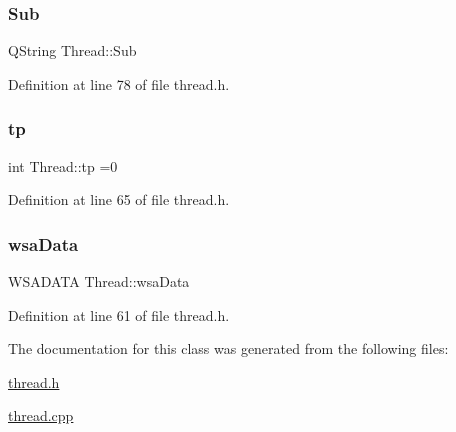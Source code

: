 \mbox{\label{class_thread_acbf38b0bc389598b66d3af13894c048f}} 
\subsubsection{\texorpdfstring{Sub}{Sub}}
{\footnotesize\ttfamily Q\+String Thread\+::\+Sub\hspace{0.3cm}{\ttfamily [private]}}



Definition at line 78 of file thread.\+h.

\mbox{\label{class_thread_a80dcf80149790844e887bdd9d3e47581}} 
\subsubsection{\texorpdfstring{tp}{tp}}
{\footnotesize\ttfamily int Thread\+::tp =0\hspace{0.3cm}{\ttfamily [private]}}



Definition at line 65 of file thread.\+h.

\mbox{\label{class_thread_af4e6c4fe4f46ba6b7c9218d3c02b9a20}} 
\subsubsection{\texorpdfstring{wsa\+Data}{wsaData}}
{\footnotesize\ttfamily W\+S\+A\+D\+A\+TA Thread\+::wsa\+Data\hspace{0.3cm}{\ttfamily [private]}}



Definition at line 61 of file thread.\+h.



The documentation for this class was generated from the following files\+:\begin{DoxyCompactItemize}
\item 
\mbox{\hyperlink{thread_8h}{thread.\+h}}\item 
\mbox{\hyperlink{thread_8cpp}{thread.\+cpp}}\end{DoxyCompactItemize}

